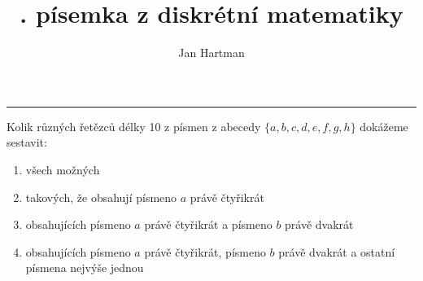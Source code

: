 \documentclass[10pt]{article}
\title{\tutnum. písemka z diskrétní matematiky}
\author{Jan Hartman}
\newcommand{\titlerule}{%
    \noindent %
    \makebox[\textwidth]{\large \thetitle \hfill Jméno: \hspace{4cm}}
    \rule{\textwidth}{0.4pt}%
}
\begin{document}
\titlerule

\begin{problem}[10 bodů]
Kolik různých řetězců délky 10 z písmen z abecedy $\{a,b,c,d,e,f,g,h\}$ dokážeme sestavit:
\begin{enumerate}[label=\alph*)]
    \item všech možných
    \item takových, že obsahují písmeno $a$ právě čtyřikrát
    \item obsahujících písmeno $a$ právě čtyřikrát a písmeno $b$ právě dvakrát
    \item obsahujících písmeno $a$ právě čtyřikrát, písmeno $b$ právě dvakrát a ostatní písmena nejvýše jednou
\end{enumerate}
\end{problem}
\end{document}
